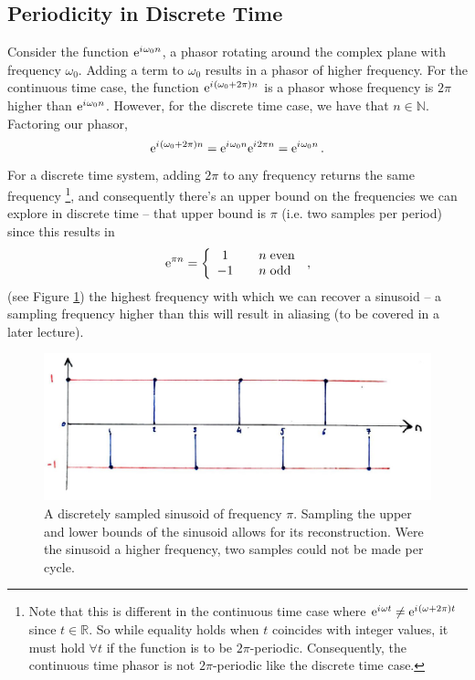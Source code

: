 \subsection{Periodicity in Discrete Time}
%
Consider the function $\mathrm{e}^{{i\mkern1mu}\omega_0 n}$, a phasor rotating around the complex plane with frequency
$\omega_0$. Adding a term to $\omega_0$ results in a phasor of higher frequency. For the continuous
time case, the function $\mathrm{e}^{{i\mkern1mu}(\omega_0 + 2\pi)n}$ is a phasor whose frequency is $2\pi$ higher
than $\mathrm{e}^{{i\mkern1mu}\omega_0 n}$. However, for the discrete time case, we have that $n\in\mathbb{N}$.
Factoring our phasor,
%
\begin{displaymath}
  \mathrm{e}^{{i\mkern1mu}(\omega_0 + 2\pi)n} = \mathrm{e}^{{i\mkern1mu}\omega_0n}\mathrm{e}^{{i\mkern1mu} 2\pi n} = \mathrm{e}^{{i\mkern1mu}\omega_0n} \,.
\end{displaymath}
%
For a discrete time system, adding $2\pi$ to any frequency returns the same frequency
\footnote{
  Note that this is different in the continuous time case where
  $\mathrm{e}^{{i\mkern1mu}\omega t} \neq \mathrm{e}^{{i\mkern1mu}(\omega + 2\pi)t}$ since $t\in\mathbb{R}$. So while equality
  holds when $t$ coincides with integer values, it must hold $\forall t$ if the function is to
  be $2\pi$-periodic. Consequently, the continuous time phasor is not $2\pi$-periodic like
  the discrete time case.
}, and consequently there's an upper bound on the frequencies we can explore in discrete
time -- that upper bound is $\pi$ (i.e. two samples per period) since this results in
%
\begin{displaymath}
  \mathrm{e}^{\pi n} = \left\{\begin{array}{ccl}
  1 & & n\hspace{1mm}\mathrm{even} \\
  -1 & & n\hspace{1mm}\mathrm{odd} \\
  \end{array}\right. \,,
\end{displaymath}
%
(see Figure \ref{fig::lecture_1_discrete_sampling}) the highest frequency with which we can recover
a sinusoid -- a sampling frequency higher than this will result in aliasing (to be covered in a
later lecture). 
%
\begin{figure}[!htb]
  \includegraphics[width=\textwidth]{images/lecture_1_discrete_sampling.JPG}
  \caption{
    A discretely sampled sinusoid of frequency $\pi$. Sampling the upper and lower bounds of
    the sinusoid allows for its reconstruction. Were the sinusoid a higher frequency, two samples
    could not be made per cycle.
  }
  \label{fig::lecture_1_discrete_sampling}
\end{figure}
